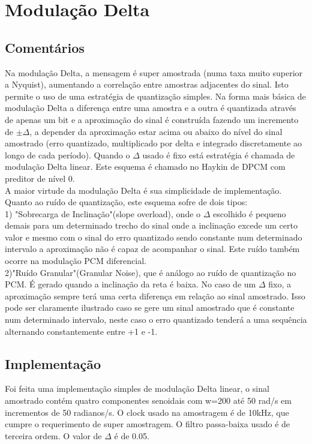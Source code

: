\section{Modulação Delta}
\subsection{Comentários}
Na modulação Delta, a mensagem é super amostrada (numa taxa muito superior a Nyquist), aumentando a correlação entre amostras adjacentes do sinal. Isto permite o uso de uma estratégia de quantização simples. Na forma mais básica de modulação Delta a diferença entre uma amostra e a outra é quantizada através de apenas um bit e a aproximação do sinal é construída fazendo um incremento de $\pm \Delta$, a depender da aproximação estar acima ou abaixo do nível do sinal amostrado (erro quantizado, multiplicado por delta e integrado discretamente ao longo de cada período). Quando o $\Delta$ usado é fixo está estratégia é chamada de modulação Delta linear. Este esquema é chamado no Haykin de DPCM com preditor de nível 0.\\

A maior virtude da modulação Delta é sua simplicidade de implementação.\\ 

Quanto ao ruído de quantização, este esquema sofre de dois tipos:\\ 
1) "Sobrecarga de Inclinação"(slope overload), onde o $\Delta$ escolhido é pequeno demais para um determinado trecho do sinal onde a inclinação excede um certo valor e mesmo com o sinal do erro quantizado sendo constante num determinado intervalo a aproximação não é capaz de acompanhar o sinal. Este ruído também ocorre na modulação PCM diferencial.\\
2)"Ruído Granular"(Granular Noise), que é análogo ao ruído de quantização no PCM. É gerado quando a inclinação da reta é baixa. No caso de um $\Delta$ fixo, a aproximação sempre terá uma certa diferença em relação ao sinal amostrado. Isso pode ser claramente ilustrado caso se gere um sinal amostrado que é constante num determinado intervalo, neste caso o erro quantizado tenderá a uma sequência alternando constantemente entre +1 e -1. 

\subsection{Implementação}
Foi feita uma implementação simples de modulação Delta linear, o sinal amostrado contém quatro componentes senoidais com w=200 até 50 rad/s em incrementos de 50 radianos/s. O clock usado na amostragem é de 10kHz, que cumpre o requerimento de super amostragem. O filtro passa-baixa usado é de terceira ordem. O valor de $\Delta$ é de 0.05.

